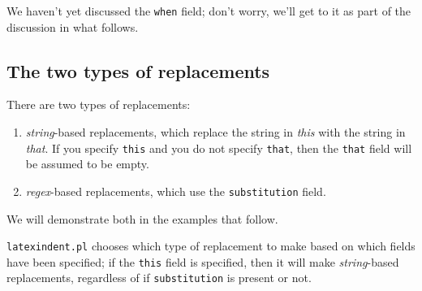 \documentclass[10pt]{article}
\begin{document}
 We haven't yet discussed the \texttt{when} field; don't worry, we'll get to it as part
 of the discussion in what follows.

\subsection{The two types of replacements}
 There are two types of replacements:
 \begin{enumerate}
  \item \emph{string}-based replacements, which replace the string in
        \emph{this} with the string in \emph{that}.
        If you specify \texttt{this} and you do not specify \texttt{that}, then the \texttt{that}
        field will be assumed to be empty.
  \item \emph{regex}-based replacements, which use the \texttt{substitution} field.
 \end{enumerate}
 We will demonstrate both in the examples that follow.

 \texttt{latexindent.pl} chooses which type of replacement to make based on which fields
 have been specified; if the \texttt{this} field is specified, then it will make
 \emph{string}-based replacements, regardless of if \texttt{substitution} is present or
 not.
\end{document}
